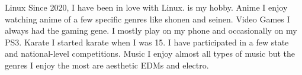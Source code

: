 



\begin{cvskills}
  \cvskill
    {Linux} %
    {Since 2020, I have been in love with Linux.  is my hobby.} %
  \cvskill
    {Anime} %
    {I enjoy watching anime of a few specific genres like shonen and seinen.} %
  \cvskill
    {Video Games} %
    {I always had the gaming gene. I mostly play on my phone and occasionally on my PS3.} %
  \cvskill
    {Karate} %
    {I started karate when I was 15. I have participated in a few state and national-level competitions.} %
  \cvskill
    {Music} %
    {I enjoy almost all types of music but the genres I enjoy the most are aesthetic EDMs and electro.} %

\end{cvskills}